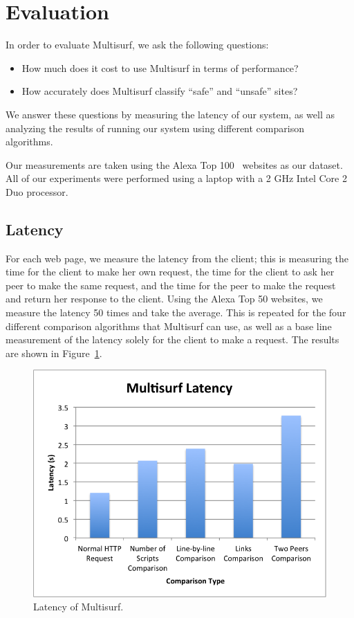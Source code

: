 \section{Evaluation}
\label{sec:eval}

In order to evaluate Multisurf, we ask the following questions:

\begin{itemize}
\item How much does it cost to use Multisurf in terms of performance?
\item How accurately does Multisurf classify ``safe'' and ``unsafe'' sites?
\end{itemize}

We answer these questions by measuring the latency of our system, as well as analyzing the results of running our system using different comparison algorithms.

Our measurements are taken using the Alexa Top 100~\cite{alexa} websites as our dataset.  All of our experiments were performed using a laptop with a 2 GHz Intel Core 2 Duo processor.  

\subsection{Latency} 
For each web page, we measure the latency from the client; this is measuring the time for the client to make her own request, the time for the client to ask her peer to make the same request, and the time for the peer to make the request and return her response to the client.  Using the Alexa Top 50 websites, we measure the latency 50 times and take the average.  This is repeated for the four different comparison algorithms that Multisurf can use, as well as a base line measurement of the latency solely for the client to make a request.  The results are shown in Figure~\ref{fig:latency}.

\begin{figure}[htb]
\label{fig:latency}
\begin{center}
\includegraphics[width=\linewidth]{latency}
\caption{Latency of Multisurf.}
\end{center}
\end{figure}

